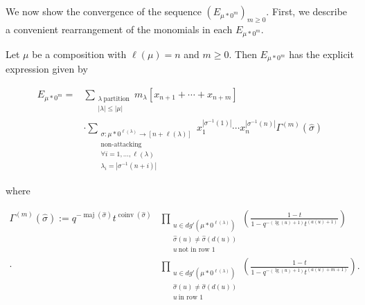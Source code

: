 \documentclass[ALCO,Unicode]{cedram}
\DeclareMathOperator{\maj}{maj}
\DeclareMathOperator{\coinv}{coinv}
\DeclareMathOperator{\mathleg}{lg}
\begin{document}
We now show the convergence of the sequence $(E_{\mu*0^m})_{m \geq 0}$. First, we describe a convenient rearrangement of the monomials in each $E_{\mu*0^m}$.

\begin{thm} \label{HHL tail expansion}

Let $\mu$ be a composition with $\ell(\mu) = n$ and $m \geq 0$. Then $E_{\mu * 0^m}$ has the explicit expression given by 

\begin{align}\label{finite variable expansion eq}
    E_{\mu * 0^m} = {} & {} \sum_{\substack{\lambda ~ \text{partition}  \\ |\lambda| \leq |\mu|}} m_{\lambda}[x_{n+1}+\cdots + x_{n+m}] \\ \nonumber & \cdot \sum_{\substack{\sigma:\mu * 0^{\ell(\lambda)}  \rightarrow [n+\ell(\lambda)]\\ \text{non-attacking} \\ \forall i = 1,\ldots,\ell(\lambda) \\ \lambda_i = |\sigma^{-1}(n+i)|}} x_1 ^{|\sigma^{-1}(1)|}\cdots x_n ^{|\sigma^{-1}(n)|} \Gamma^{(m)} (\widehat{\sigma})
\end{align}

where 

\begin{equation*}
\begin{split}
     \Gamma^{(m)}(\widehat{\sigma}) :=
       q^{-\maj(\widehat{\sigma})}t^{\coinv(\widehat{\sigma})} & \prod_{\substack{ u \in dg'(\mu * 0^{\ell(\lambda)}) \\ \widehat{\sigma}(u) \neq \widehat{\sigma}(d(u)) \\ u ~ \text{not in row } 1 }} \left( \frac{1-t}{1-q^{-(\mathleg(u)+1)}t^{(a(u)+1)}} \right) \\ \cdot & \prod_{\substack{ u \in dg'(\mu * 0^{\ell(\lambda)}) \\ \widehat{\sigma}(u) \neq \widehat{\sigma}(d(u)) \\ u ~ \text{in row } 1 }} \left( \frac{1-t}{1-q^{-(\mathleg(u) +1)}t^{(a(u) + m + 1)}} \right).
\end{split}
\end{equation*}

 
 \end{thm}
 
\end{document}
